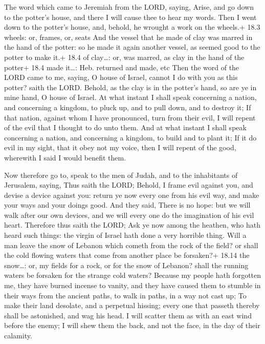  The word which came to Jeremiah from the LORD, saying,
 Arise, and go down to the potter's house, and there I will
cause thee to hear my words.  Then I went down to the
potter's house, and, behold, he wrought a work on the wheels.+ 18.3
wheels: or, frames, or, seats  And the vessel that he made
of clay was marred in the hand of the potter: so he made it again
another vessel, as seemed good to the potter to make it.+ 18.4 of
clay\ldots: or, was marred, as clay in the hand of the potter+ 18.4 made
it\ldots: Heb. returned and made, etc  Then the word of the
LORD came to me, saying,  O house of Israel, cannot I do
with you as this potter? saith the LORD. Behold, as the clay is in the
potter's hand, so are ye in mine hand, O house of Israel. 
At what instant I shall speak concerning a nation, and concerning a
kingdom, to pluck up, and to pull down, and to destroy it; 
If that nation, against whom I have pronounced, turn from their evil, I
will repent of the evil that I thought to do unto them.  And
at what instant I shall speak concerning a nation, and concerning a
kingdom, to build and to plant it;  If it do evil in my
sight, that it obey not my voice, then I will repent of the good,
wherewith I said I would benefit them.

 Now therefore go to, speak to the men of Judah, and to
the inhabitants of Jerusalem, saying, Thus saith the LORD; Behold, I
frame evil against you, and devise a device against you: return ye now
every one from his evil way, and make your ways and your doings good.
 And they said, There is no hope: but we will walk after
our own devices, and we will every one do the imagination of his evil
heart.  Therefore thus saith the LORD; Ask ye now among the
heathen, who hath heard such things: the virgin of Israel hath done a
very horrible thing.  Will a man leave the snow of Lebanon
which cometh from the rock of the field? or shall the cold flowing
waters that come from another place be forsaken?+ 18.14 the snow\ldots:
or, my fields for a rock, or for the snow of Lebanon? shall the running
waters be forsaken for the strange cold waters?  Because my
people hath forgotten me, they have burned incense to vanity, and they
have caused them to stumble in their ways from the ancient paths, to
walk in paths, in a way not cast up;  To make their land
desolate, and a perpetual hissing; every one that passeth thereby shall
be astonished, and wag his head.  I will scatter them as
with an east wind before the enemy; I will shew them the back, and not
the face, in the day of their calamity.

